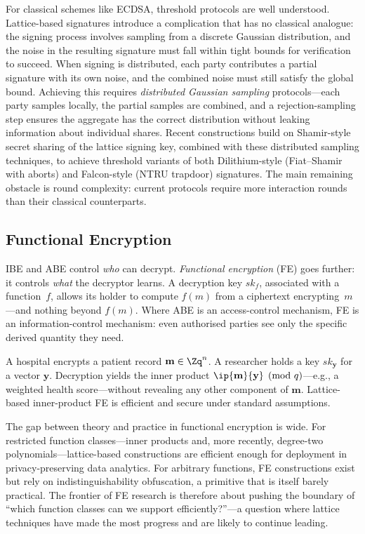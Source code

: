 For classical schemes like ECDSA, threshold protocols are well understood.  Lattice-based signatures introduce a complication that has no classical analogue: the signing process involves sampling from a discrete Gaussian distribution, and the noise in the resulting signature must fall within tight bounds for verification to succeed.  When signing is distributed, each party contributes a partial signature with its own noise, and the combined noise must still satisfy the global bound.  Achieving this requires \emph{distributed Gaussian sampling} protocols---each party samples locally, the partial samples are combined, and a rejection-sampling step ensures the aggregate has the correct distribution without leaking information about individual shares.  Recent constructions build on Shamir-style secret sharing of the lattice signing key, combined with these distributed sampling techniques, to achieve threshold variants of both Dilithium-style (Fiat--Shamir with aborts) and Falcon-style (NTRU trapdoor) signatures.  The main remaining obstacle is round complexity: current protocols require more interaction rounds than their classical counterparts.


\subsection{Functional Encryption}
\label{subsec:fe}

IBE and ABE control \emph{who} can decrypt.  \emph{Functional encryption} (FE) goes further: it controls \emph{what} the decryptor learns.  A decryption key $\mathit{sk}_f$, associated with a function~$f$, allows its holder to compute $f(m)$ from a ciphertext encrypting~$m$---and nothing beyond $f(m)$.  Where ABE is an access-control mechanism, FE is an information-control mechanism: even authorised parties see only the specific derived quantity they need.

\begin{example}
\label{ex:ipfe}
A hospital encrypts a patient record $\mathbf{m} \in \Zq^n$.  A researcher holds a key $\mathit{sk}_{\mathbf{y}}$ for a vector $\mathbf{y}$.  Decryption yields the inner product $\ip{\mathbf{m}}{\mathbf{y}} \pmod{q}$---e.g., a weighted health score---without revealing any other component of $\mathbf{m}$.  Lattice-based inner-product FE is efficient and secure under standard \lwe{} assumptions.
\end{example}

The gap between theory and practice in functional encryption is wide.  For restricted function classes---inner products and, more recently, degree-two polynomials---lattice-based constructions are efficient enough for deployment in privacy-preserving data analytics.  For arbitrary functions, FE constructions exist but rely on indistinguishability obfuscation, a primitive that is itself barely practical.  The frontier of FE research is therefore about pushing the boundary of ``which function classes can we support efficiently?''---a question where lattice techniques have made the most progress and are likely to continue leading.

